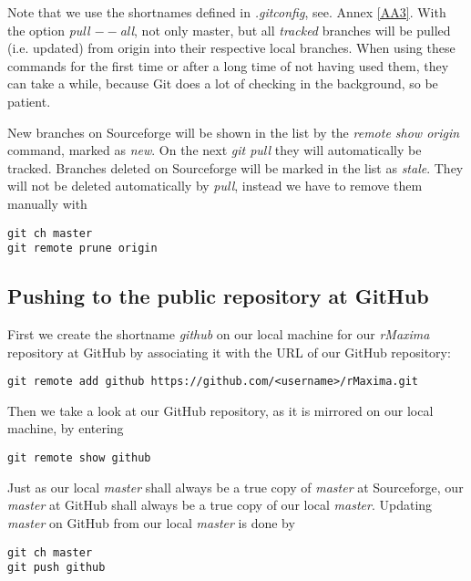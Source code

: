 \documentclass[../Maxima_Workbook.tex]{subfiles}
\begin{document}
Note that we use the shortnames defined in \emph{.gitconfig}, see. Annex \ref{AA3}. With the option \emph{pull $ -- $all}, not only master, but all \emph{tracked} branches will be pulled (i.e. updated) from origin into their respective local branches. When using these commands for the first time or after a long time of not having used them, they can take a while, because Git does a lot of checking in the background, so be patient.

\lz New branches on Sourceforge will be shown in the list by the \emph{remote show origin} command, marked as \emph{new}. On the next \emph{git pull} they will automatically be tracked. Branches deleted on Sourceforge will be marked in the list as \emph{stale}. They will not be deleted automatically by \emph{pull}, instead we have to remove them manually with

\begin{lstlisting}[style=smallblue]
git ch master
git remote prune origin
\end{lstlisting}

\subsection{Pushing to the public repository at GitHub}

First we create the shortname \emph{github} on our local machine for our \emph{rMaxima} repository at GitHub by associating it with the URL of our GitHub repository:

\begin{lstlisting}[style=smallblue]
git remote add github https://github.com/<username>/rMaxima.git
\end{lstlisting}

Then we take a look at our GitHub repository, as it is mirrored on our local machine, by entering

\begin{lstlisting}[style=smallblue]
git remote show github
\end{lstlisting}

\lz Just as our local \emph{master} shall always be a true copy of \emph{master} at Sourceforge, our \emph{master} at GitHub shall always be a true copy of our local \emph{master}. Updating \emph{master} on GitHub from our local \emph{master} is done by

\begin{lstlisting}[style=smallblue]
git ch master
git push github
\end{lstlisting}
\end{document}
